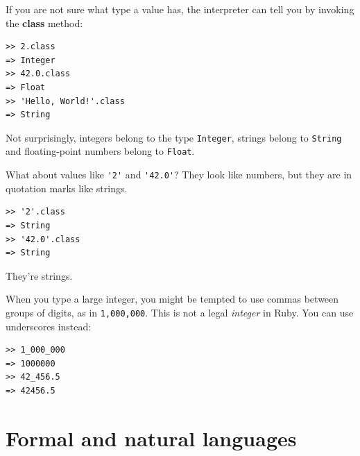 \documentclass[10pt]{book}
\begin{document}
If you are not sure what type a value has, the interpreter can
tell you by invoking the {\bf class} method:

\begin{verbatim}
>> 2.class
=> Integer
>> 42.0.class
=> Float
>> 'Hello, World!'.class
=> String
\end{verbatim}
%

Not surprisingly, integers belong to the type {\tt Integer},
strings belong to {\tt String} and floating-point
numbers belong to {\tt Float}.  

What about values like \verb"'2'" and \verb"'42.0'"?
They look like numbers, but they are in quotation marks like
strings.

\begin{verbatim}
>> '2'.class
=> String
>> '42.0'.class
=> String
\end{verbatim}
%
They're strings.

When you type a large integer, you might be tempted to use commas
between groups of digits, as in {\tt 1,000,000}.  This is not a
legal {\em integer} in Ruby.  You can use underscores instead:

\begin{verbatim}
>> 1_000_000
=> 1000000
>> 42_456.5
=> 42456.5
\end{verbatim}
%




\section{Formal and natural languages}
\end{document}
